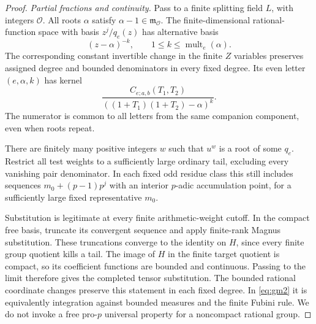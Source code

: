 \documentclass[11pt]{article}
\theoremstyle{definition}
\numberwithin{equation}{section}
\begin{document}
\begin{proof}
\emph{Partial fractions and continuity.}
Pass to a finite splitting field $L$, with integers $\mathcal O$.
All roots $\alpha$ satisfy $\alpha-1\in\mathfrak m_{\mathcal O}$.
The finite-dimensional rational-function space with basis
$z^j/q_e(z)$ has alternative basis
\begin{equation}
 (z-\alpha)^{-k},\qquad
 1\le k\le\operatorname{mult}_e(\alpha).
\end{equation}
The corresponding constant invertible change in the finite $Z$
variables preserves assigned degree and bounded denominators in
every fixed degree. Its even letter $(e,\alpha,k)$ has kernel
\begin{equation}
 \frac{C_{e;a,b}(T_1,T_2)}
      {((1+T_1)(1+T_2)-\alpha)^k}.                          \label{eq:gm5}
\end{equation}
The numerator is common to all letters from the same companion
component, even when roots repeat.

There are finitely many positive integers $w$ such that $u^w$ is a
root of some $q_e$. Restrict all test weights to a sufficiently
large ordinary tail, excluding every vanishing pair denominator.
In each fixed odd residue class this still includes sequences
$m_0+(p-1)p^j$ with an interior $p$-adic accumulation point, for
a sufficiently large fixed representative $m_0$.

Substitution is legitimate at every finite arithmetic-weight cutoff.
In the compact free basis, truncate its convergent sequence and
apply finite-rank Magnus substitution. These truncations converge
to the identity on $H$, since every finite group quotient kills a
tail. The image of $H$ in the finite target quotient is compact,
so its coefficient functions are bounded and continuous. Passing
to the limit therefore gives the completed tensor substitution.
The bounded rational coordinate changes preserve this statement in
each fixed degree. In \eqref{eq:gm2} it is equivalently integration against
bounded measures and the finite Fubini rule. We do not invoke a
free pro-$p$ universal property for a noncompact rational group.


\end{proof}
\end{document}
